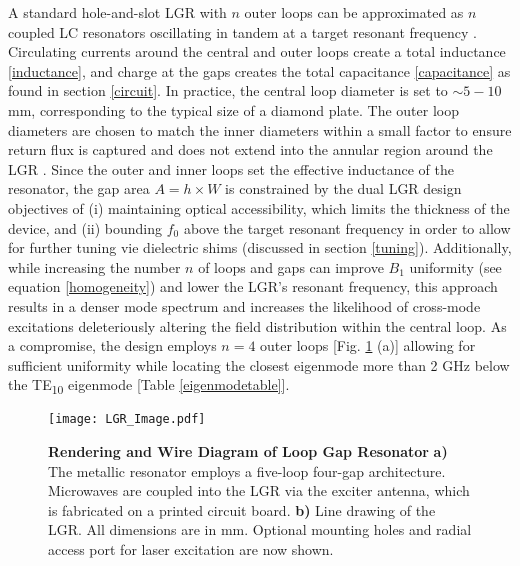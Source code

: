 A standard hole-and-slot LGR with $n$ outer loops can be approximated as $n$ coupled LC resonators oscillating in tandem at a target resonant frequency \cite{wood1984loop}. Circulating currents around the central and outer loops create a total inductance \ref{inductance}, and charge at the gaps creates the total capacitance \ref{capacitance} as found in section \ref{circuit}. In practice, the central loop diameter is set to $\sim 5-10 $ mm, corresponding to the typical size of a diamond plate. The outer loop diameters are chosen to match the inner diameters within a small factor to ensure return flux is captured and does not extend into the annular region around the LGR \cite{mehdizadeh1983Loop}. Since the outer and inner loops set the effective inductance of the resonator, the gap area $A = h \times W$ is constrained by the dual LGR design objectives of (i) maintaining optical accessibility, which limits the thickness of the device, and (ii) bounding $f_0$ above the target resonant frequency in order to allow for further tuning vie dielectric shims (discussed in section \ref{tuning}). Additionally, while increasing the number $n$ of loops and gaps can improve $B_1$ uniformity (see equation \ref{homogeneity}) and lower the LGR's resonant frequency, this approach results in a denser mode spectrum \cite{froncisz1982loop} and increases the likelihood of cross-mode excitations deleteriously altering the field distribution within the central loop. As a compromise, the design employs $n=4$ outer loops [Fig. \ref{LGR_drawing} (a)] allowing for sufficient uniformity while locating the closest eigenmode more than 2 GHz below the TE\textsubscript{10} eigenmode [Table \ref{eigenmodetable}].  

\begin{figure}[t!]
\centering
\texttt{[image: LGR\_Image.pdf]}  
\caption{\textbf{Rendering and Wire Diagram of Loop Gap Resonator} \textbf{a)} The metallic resonator employs a five-loop four-gap architecture. Microwaves are coupled into the LGR via the exciter antenna, which is fabricated on a printed circuit board. \textbf{b)} Line drawing of the LGR. All dimensions are in mm. Optional mounting holes and radial access port for laser excitation are now shown.}
\label{LGR_drawing}
\end{figure}

